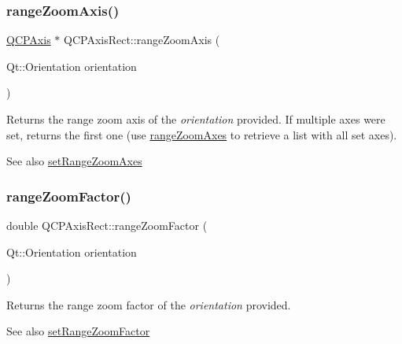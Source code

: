 \subsubsection{\texorpdfstring{range\+Zoom\+Axis()}{rangeZoomAxis()}}
{\footnotesize\ttfamily \hyperlink{class_q_c_p_axis}{Q\+C\+P\+Axis} $\ast$ Q\+C\+P\+Axis\+Rect\+::range\+Zoom\+Axis (\begin{DoxyParamCaption}\item[{Qt\+::\+Orientation}]{orientation }\end{DoxyParamCaption})}

Returns the range zoom axis of the {\itshape orientation} provided. If multiple axes were set, returns the first one (use \hyperlink{class_q_c_p_axis_rect_a86aac0f435f209d60dacd22cda10c104}{range\+Zoom\+Axes} to retrieve a list with all set axes).

\begin{DoxySeeAlso}{See also}
\hyperlink{class_q_c_p_axis_rect_a9442cca2aa358405f39a64d51eca13d2}{set\+Range\+Zoom\+Axes} 
\end{DoxySeeAlso}
\mbox{\label{class_q_c_p_axis_rect_ae4e6c4d143aacc88d2d3c56f117c2fe1}} 
\subsubsection{\texorpdfstring{range\+Zoom\+Factor()}{rangeZoomFactor()}}
{\footnotesize\ttfamily double Q\+C\+P\+Axis\+Rect\+::range\+Zoom\+Factor (\begin{DoxyParamCaption}\item[{Qt\+::\+Orientation}]{orientation }\end{DoxyParamCaption})}

Returns the range zoom factor of the {\itshape orientation} provided.

\begin{DoxySeeAlso}{See also}
\hyperlink{class_q_c_p_axis_rect_a895d7ac745ea614e04056244b3c138ac}{set\+Range\+Zoom\+Factor} 
\end{DoxySeeAlso}
\mbox{\label{class_q_c_p_axis_rect_a03c39cd9704f0d36fb6cf980cdddcbaa}} 

